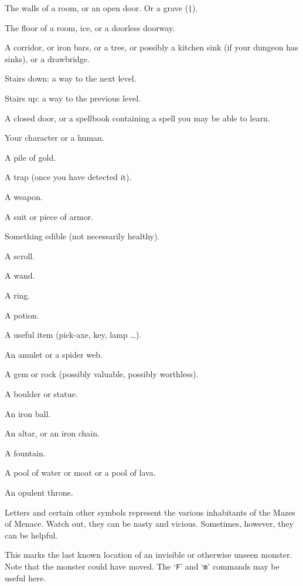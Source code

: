 \blist{}
\item[\tb{- {\rm and} |}]
The walls of a room, or an open door.  Or a grave ({\tt |}).
\item[\tb{.}]
The floor of a room, ice, or a doorless doorway.
\item[\tb{\#}]
A corridor, or iron bars, or a tree, or possibly a kitchen sink (if
your dungeon has sinks), or a drawbridge.
\item[\tb{>}]
Stairs down: a way to the next level.
\item[\tb{<}]
Stairs up: a way to the previous level.
\item[\tb{+}]
A closed door, or a spellbook containing a spell you may be able to learn.
\item[\tb{@}]
Your character or a human.
\item[\tb{\$}]
A pile of gold.
\item[\tb{\^}]
A trap (once you have detected it).
\item[\tb{)}]
A weapon.
\item[\tb{[}]
A suit or piece of armor.
\item[\tb{\%}]
Something edible (not necessarily healthy).
\item[\tb{?}]
A scroll.
\item[\tb{/}]
A wand.
\item[\tb{=}]
A ring.
\item[\tb{!}]
A potion.
\item[\tb{(}]
A useful item (pick-axe, key, lamp \ldots).
\item[\tb{"}]
An amulet or a spider web.
\item[\tb{*}]
A gem or rock (possibly valuable, possibly worthless).
\item[\tb{\`}]
A boulder or statue.
\item[\tb{0}]
An iron ball.
\item[\tb{_}]
An altar, or an iron chain.
\item[\tb{\{}]
A fountain.
\item[\tb{\}}]
A pool of water or moat or a pool of lava.
\item[\tb{$\backslash$}]
An opulent throne.
\item[\tb{a-zA-Z {\rm \& other symbols}}]
Letters and certain other symbols represent the various inhabitants
of the Mazes of Menace.  Watch out, they can be nasty and vicious.
Sometimes, however, they can be helpful.
\item[\tb{I}]
This marks the last known location of an invisible or otherwise unseen
monster.  Note that the monster could have moved.
The `{\tt F}' and `{\tt m}' commands may be useful here.


